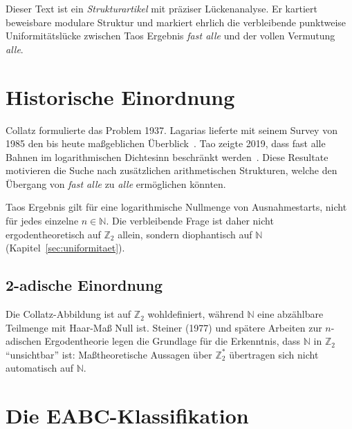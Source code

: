 \documentclass[12pt,a4paper]{article}
\newcommand{\N}{\mathbb{N}}
\newcommand{\Ztwo}{\mathbb{Z}_2}
\begin{document}
\begin{tcolorbox}[kern]
Dieser Text ist ein \emph{Strukturartikel} mit präziser Lückenanalyse.
Er kartiert beweisbare modulare Struktur und markiert ehrlich die
verbleibende punktweise Uniformitätslücke zwischen Taos Ergebnis
\emph{fast alle} und der vollen Vermutung \emph{alle}.
\end{tcolorbox}

\section{Historische Einordnung}
\label{sec:historie}

Collatz formulierte das Problem 1937.
Lagarias lieferte mit seinem Survey von 1985 den
bis heute maßgeblichen Überblick~\cite{Lagarias1985}.
Tao zeigte 2019, dass fast alle Bahnen
im logarithmischen Dichtesinn beschränkt werden~\cite{Tao2019}.
Diese Resultate motivieren die Suche nach
zusätzlichen arithmetischen Strukturen,
welche den Übergang von
\emph{fast alle}
zu
\emph{alle}
ermöglichen könnten.

\begin{tcolorbox}[kern]
Taos Ergebnis gilt für eine logarithmische Nullmenge von
Ausnahmestarts, nicht für jedes einzelne $n \in \N$.
Die verbleibende Frage ist daher nicht ergodentheoretisch
auf $\Ztwo$ allein, sondern diophantisch auf $\N$
(Kapitel~\ref{sec:uniformitaet}).
\end{tcolorbox}

\subsection{2-adische Einordnung}

Die Collatz-Abbildung ist auf $\Ztwo$ wohldefiniert, während $\N$
eine abzählbare Teilmenge mit Haar-Maß Null ist. Steiner (1977) und
spätere Arbeiten zur $n$-adischen Ergodentheorie legen die Grundlage
für die Erkenntnis, dass $\N$ in $\Ztwo$ ``unsichtbar'' ist: Maßtheoretische
Aussagen über $\Ztwo^*$ übertragen sich nicht automatisch auf $\N$.

\section{Die EABC-Klassifikation}
\label{sec:eabc}
\end{document}
